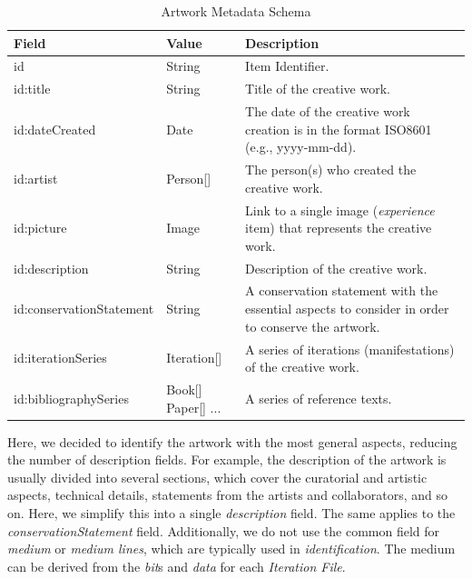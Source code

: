 \begin{longtable}{|p{}|p{}|p{}|}
    \caption{Artwork Metadata Schema} \label{tab:c4-artwork} \\
    \hline
    \textbf{Field} & \textbf{Value} & \textbf{Description} \\
    \hline
    \endfirsthead

    \scriptsize id                      & \scriptsize String                                            &  \scriptsize Item Identifier. \\
    \hline
    \scriptsize id:title                   & \scriptsize String                                            &  \scriptsize Title of the creative work.\\
    \hline
    \scriptsize id:dateCreated             & \scriptsize Date                                              &  \scriptsize The date of the creative work creation is in the format ISO8601 (e.g., yyyy-mm-dd).\\
    \hline
    \scriptsize id:artist                  & \scriptsize \textcolor{uniudColor3}{Person}[]                 &  \scriptsize The person(s) who created the creative work. \\
    \hline
    \scriptsize id:picture                 & \scriptsize \textcolor{uniudColor3}{Image}                    &  \scriptsize Link to a single image (\textit{experience} item) that represents the creative work. \\
    \hline
    \scriptsize id:description             & \scriptsize String                                            &  \scriptsize Description of the creative work. \\
    \hline
    \scriptsize id:conservationStatement   & \scriptsize String                                            &  \scriptsize A conservation statement with the essential aspects to consider in order to conserve the artwork.\\
    \hline
    \scriptsize id:iterationSeries         & \scriptsize \textcolor{uniudColor3}{Iteration}[]              &  \scriptsize A series of iterations (manifestations) of the creative work. \\
    \hline
    \scriptsize id:bibliographySeries      & \scriptsize \textcolor{uniudColor3}{Book}[] \textcolor{uniudColor3}{Paper}[] ...   &  \scriptsize A series of reference texts. \\
    \hline

\end{longtable}
Here, we decided to identify the artwork with the most general aspects, reducing the number of description fields. For example, the description of the artwork is usually divided into several sections, which cover the curatorial and artistic aspects, technical details, statements from the artists and collaborators, and so on. Here, we simplify this into a single \textit{description} field. The same applies to the \textit{conservationStatement} field. Additionally, we do not use the common field for \textit{medium} or \textit{medium lines}, which are typically used in \textit{identification}. The medium can be derived from the \textit{bit}s and \textit{data} for each \textit{Iteration File}.\\
